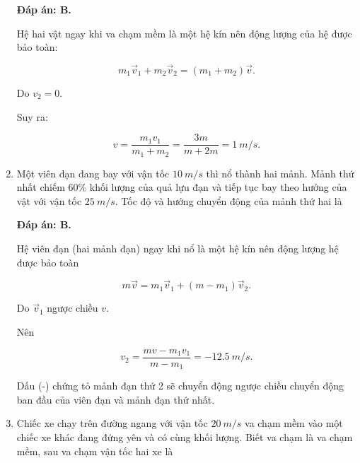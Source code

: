 \begin{enumerate}[label=\bfseries Câu \arabic*:]
{		
	}
	
	\hideall
	{	
		\textbf{Đáp án: B.}
		
		Hệ hai vật ngay khi va chạm mềm là một hệ kín nên động lượng của hệ được bảo toàn:
		
		$$m_1\vec v_1 + m_2\vec v_2 = (m_1+m_2)\vec v.$$
		
		Do $v_2 = 0.$
		
		Suy ra:
		
		$$ v = \dfrac{m_1v_1}{m_1+m_2} = \dfrac{3m}{m+2m} = \SI{1}{m/s}.$$
		
	}
	\item {}
	
	
	{
		Một viên đạn đang bay với vận tốc $\SI{10}{m/s}$ thì nổ thành hai mảnh. Mảnh thứ nhất chiếm $60\%$ khối lượng của quả lựu đạn và tiếp tục bay theo hướng của vật với vận tốc $\SI{25}{m/s}$. Tốc độ và hướng chuyển động của mảnh thứ hai là 
	}
	
	\hideall
	{	
		\textbf{Đáp án: B.}
		
		Hệ viên đạn (hai mảnh đạn) ngay khi nổ là một hệ kín nên động lượng hệ được bảo toàn
		
		$$m\vec v = m_1 \vec v_1 + (m-m_1)\vec v_2.$$
		
		Do $\vec v_1$ ngược chiều $v$.
		
		Nên 
		
		$$v_2 = \dfrac{mv - m_1v_1}{m-m_1} = -\SI{12,5}{m/s}.$$
		
		Dấu (-) chứng tỏ mảnh đạn thứ 2 sẽ chuyển động ngược chiều chuyển động ban đầu của viên đạn và mảnh đạn thứ nhất.
	}
		\item {}
	
	
	{Chiếc xe chạy trên đường ngang với vận tốc $\SI{20}{m/s}$ va chạm mềm vào một chiếc xe khác đang đứng yên và có cùng khối lượng. Biết va chạm là va chạm mềm, sau va chạm vận tốc hai xe là
	}
	

\end{enumerate}
